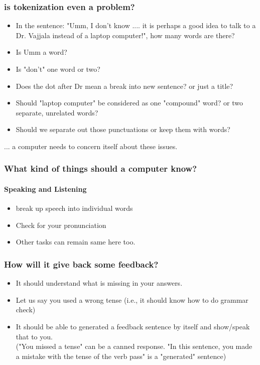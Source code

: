 \documentclass{beamer}
\begin{document}
\begin{frame}
\frametitle{is tokenization even a problem?}
\begin{itemize}
\item In the sentence: "Umm, I don't know .... it is perhaps a good idea to talk to a Dr. Vajjala instead of a laptop computer!", how many words are there? \pause
\item Is Umm  a word?
\item Is "don't" one word or two?
\item Does the dot after Dr mean a break into new sentence? or just a title?
\item Should "laptop computer" be considered as one "compound" word? or two separate, unrelated words?
\item Should we separate out those punctuations or keep them with words?
\end{itemize}
... a computer needs to concern itself about these issues. 
\end{frame}

\begin{frame}
\frametitle{What kind of things should a computer know?}
\framesubtitle{Speaking and Listening}
\begin{itemize}
\item break up speech into individual words 
\item Check for your pronunciation
\item Other tasks can remain same here too.
\end{itemize}
\end{frame}

\begin{frame}
\frametitle{How will it give back some feedback?}
\begin{itemize}
\item It should understand what is missing in your answers.
\item Let us say you used a wrong tense (i.e., it should know how to do grammar check)
\item It should be able to generated a feedback sentence by itself and show/speak that to you. 
\\ ("You missed a tense" can be a canned response. "In this sentence, you made a mistake with the tense of the verb pass" is a "generated" sentence)
\end{itemize}
\end{frame}
\end{document}
